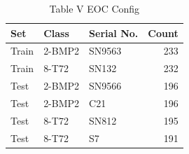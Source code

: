 \begin{table}
\caption{Table V EOC Config}
\begin{tabular}{lllr}
\toprule
Set & Class & Serial No. & Count \\
\midrule
Train & 2-BMP2 & SN9563 & 233 \\
Train & 8-T72 & SN132 & 232 \\
Test & 2-BMP2 & SN9566 & 196 \\
Test & 2-BMP2 & C21 & 196 \\
Test & 8-T72 & SN812 & 195 \\
Test & 8-T72 & S7 & 191 \\
\bottomrule
\end{tabular}
\end{table}
